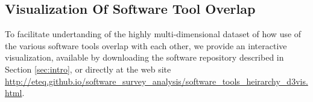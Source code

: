 \subsection{Visualization Of Software Tool Overlap}

To facilitate undertanding of the highly multi-dimensional dataset of how use of the various software tools overlap with each other, we provide an interactive visualization, available by downloading the software repository described in Section \ref{sec:intro}, or directly at the web site \url{http://eteq.github.io/software_survey_analysis/software_tools_heirarchy_d3vis.html}.
